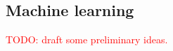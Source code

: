 \documentclass[12pt]{article}
\makeatletter
\renewcommand\paragraph{%
	\@startsection{paragraph}
	{4}
	{\z@}
	{3.25ex \@plus1ex \@minus.2ex}
	{-1em}
	{\normalfont\normalsize\bfseries\maybe@addperiod}%
}
\newcommand{\maybe@addperiod}[1]{%
	#1\@addpunct{.}%
}
\DeclareMathOperator*{\argmin}{arg\,min}
\makeatother
\begin{document}
\subsection{Machine learning}
\textcolor{red}{TODO: draft some preliminary ideas.}
%
%
\newpage


\end{document}
